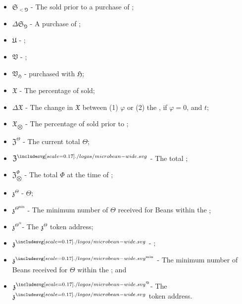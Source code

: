 \documentclass[class=article, crop=false]{standalone}
\begin{document}
\begin{itemize}[topsep=0pt, itemsep=3pt,leftmargin=16pt]
    \item[] $\mathfrak{S}_{<\Game}$ - \hypertarget{ht175}{The  sold prior to a purchase of };
    \item[] $\Delta \mathfrak{S}_{\Game}$ - \hypertarget{ht61}{A purchase of };
    \item[] $\mathfrak{U}$ - \hypertarget{ht209}{ };
    \item[] $\mathfrak{V}$ - \hypertarget{ht217}{};
    \item[] $\mathfrak{V}_\mathfrak{H}$ - \hypertarget{ht218}{ purchased with  $\mathfrak{H}$};
    \item[] $\mathfrak{X}$ - \hypertarget{ht225}{The percentage of  sold};
    \item[] $\Delta \mathfrak{X}$ - \hypertarget{ht62}{The change in $\mathfrak{X}$ between (1) $\varphi$ or (2) the , if $\varphi = 0$, and $t$};
    \item[] $\mathfrak{X}_{\bigotimes}$ - \hypertarget{ht226}{The percentage of  sold prior to };
    \item[] $\mathfrak{Z}^{\Theta}$ - \hypertarget{ht230}{The current total  $\Theta$};
    \item[] $\mathfrak{Z}^{\bean}$ - \hypertarget{ht229}{The total  \Bean};
    \item[] $\mathfrak{Z}_{\bigotimes}^{\Phi}$ - \hypertarget{ht232}{The total  $\Phi$ at the time of };
    \item[] $\mathfrak{z}^{\Theta}$ - \hypertarget{ht235}{ $\Theta$};
    \item[] $\mathfrak{z}^{\Theta^{\text{min}}}$ - \hypertarget{ht236}{The minimum number of  $\Theta$ received for    Beans within the };
    \item[] $\mathfrak{z}^{\Theta^@}$- The $\mathfrak{z}^{\Theta}$ token address;
    \item[] $\mathfrak{z}^{\bean}$ - \hypertarget{ht233}{ \Bean};
    \item[] $\mathfrak{z}^{\bean^{\text{min}}}$ - \hypertarget{ht234}{The minimum number of  Beans received for    $\Theta$ within the }; and
    \item[] $\mathfrak{z}^{\bean^@}$- The $\mathfrak{z}^{\bean}$ token address.
\end{itemize}
\end{document}
